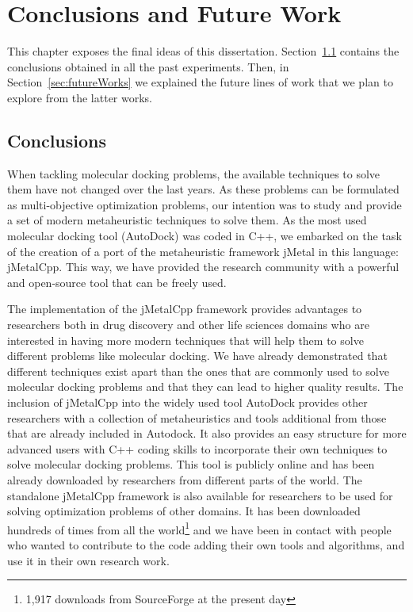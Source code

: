 \chapter{Conclusions and Future Work}
\label{chapter:conclusions}

This chapter exposes the final ideas of this dissertation. Section~\ref{sec:conclusions} contains the conclusions obtained in all the past experiments. Then, in Section~\ref{sec:futureWorks} we explained the future lines of work that we plan to explore from the latter works.

\section{Conclusions}
\label{sec:conclusions}

When tackling molecular docking problems, the available techniques to solve them have not changed over the last years. As these problems can be formulated as multi-objective optimization problems, our intention was to study and provide a set of modern metaheuristic techniques to solve them. As the most used molecular docking tool (AutoDock) was coded in C++, we embarked on the task of the creation of a port of the metaheuristic framework jMetal in this language: jMetalCpp. This way, we have provided the research community with a powerful and open-source tool that can be freely used.

The implementation of the jMetalCpp framework provides advantages to researchers both in drug discovery and other life sciences domains who are interested in having more modern techniques that will help them to solve different problems like molecular docking. We have already demonstrated that different techniques exist apart than the ones that are commonly used to solve molecular docking problems and that they can lead to higher quality results. The inclusion of jMetalCpp into the widely used tool AutoDock provides other researchers with a collection of metaheuristics and tools additional from those that are already included in Autodock. It also provides an easy structure for more advanced users with C++ coding skills to incorporate their own techniques to solve molecular docking problems. This tool is publicly online and has been already downloaded by researchers from different parts of the world. The standalone jMetalCpp framework is also available for researchers to be used for solving optimization problems of other domains. It has been downloaded hundreds of times from all the world\footnote{1,917 downloads from SourceForge at the present day} and we have been in contact with people who wanted to contribute to the code adding their own tools and algorithms, and use it in their own research work.

